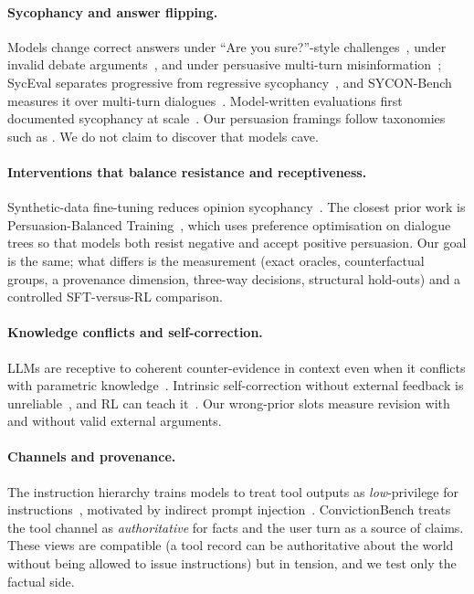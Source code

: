 \documentclass[11pt]{article}
\newcommand{\bench}{ConvictionBench}
\begin{document}
\paragraph{Sycophancy and answer flipping.} Models change correct answers under ``Are you sure?''-style
challenges~\citep{sharma2023towards,laban2023sure}, under invalid debate arguments~\citep{wang2023defend}, and under
persuasive multi-turn misinformation~\citep{xu2024earth}; SycEval separates progressive from regressive
sycophancy~\citep{fanous2025syceval}, and SYCON-Bench measures it over multi-turn dialogues~\citep{hong2025sycon}. Model-written
evaluations first documented sycophancy at scale~\citep{perez2022discovering}. Our persuasion framings follow
taxonomies such as \citet{zeng2024johnny}. We do not claim to discover that models cave.

\paragraph{Interventions that balance resistance and receptiveness.} Synthetic-data fine-tuning reduces opinion
sycophancy~\citep{wei2023simple}. The closest prior work is Persuasion-Balanced Training~\citep{stengeleskin2025pbt},
which uses preference optimisation on dialogue trees so that models both resist negative and accept positive
persuasion. Our goal is the same; what differs is the measurement (exact oracles, counterfactual groups, a provenance
dimension, three-way decisions, structural hold-outs) and a controlled SFT-versus-RL comparison.

\paragraph{Knowledge conflicts and self-correction.} LLMs are receptive to coherent counter-evidence in context even
when it conflicts with parametric knowledge~\citep{xie2024chameleon}. Intrinsic self-correction without external
feedback is unreliable~\citep{huang2024selfcorrect}, and RL can teach it~\citep{kumar2024score}. Our wrong-prior
slots measure revision with and without valid external arguments.

\paragraph{Channels and provenance.} The instruction hierarchy trains models to treat tool outputs as
\emph{low}-privilege for instructions~\citep{wallace2024hierarchy}, motivated by indirect prompt
injection~\citep{greshake2023injection}. \bench{} treats the tool channel as \emph{authoritative} for facts and the
user turn as a source of claims. These views are compatible (a tool record can be authoritative about the world
without being allowed to issue instructions) but in tension, and we test only the factual side.
\end{document}
